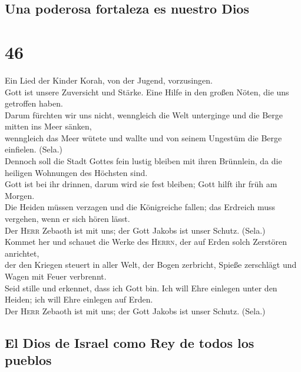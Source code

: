 \hypertarget{una-poderosa-fortaleza-es-nuestro-dios}{%
\subsection{Una poderosa fortaleza es nuestro
Dios}\label{una-poderosa-fortaleza-es-nuestro-dios}}

\hypertarget{section-45}{%
\section{46}\label{section-45}}

 Ein Lied der Kinder Korah, von der Jugend, vorzusingen.\\
 Gott ist unsere Zuversicht und Stärke. Eine Hilfe in den
großen Nöten, die uns getroffen haben.\\
 Darum fürchten wir uns nicht, wenngleich die Welt
unterginge und die Berge mitten ins Meer sänken,\\
 wenngleich das Meer wütete und wallte und von seinem
Ungestüm die Berge einfielen. (Sela.)\\
 Dennoch soll die Stadt Gottes fein lustig bleiben mit
ihren Brünnlein, da die heiligen Wohnungen des Höchsten sind.\\
 Gott ist bei ihr drinnen, darum wird sie fest bleiben;
Gott hilft ihr früh am Morgen.\\
 Die Heiden müssen verzagen und die Königreiche fallen;
das Erdreich muss vergehen, wenn er sich hören lässt.\\
 Der \textsc{Herr} Zebaoth ist mit uns; der Gott Jakobs
ist unser Schutz. (Sela.)\\
 Kommet her und schauet die Werke des \textsc{Herrn}, der
auf Erden solch Zerstören anrichtet,\\
 der den Kriegen steuert in aller Welt, der Bogen
zerbricht, Spieße zerschlägt und Wagen mit Feuer verbrennt.\\
 Seid stille und erkennet, dass ich Gott bin. Ich will
Ehre einlegen unter den Heiden; ich will Ehre einlegen auf Erden.\\
 Der \textsc{Herr} Zebaoth ist mit uns; der Gott Jakobs
ist unser Schutz. (Sela.)

\hypertarget{el-dios-de-israel-como-rey-de-todos-los-pueblos}{%
\subsection{El Dios de Israel como Rey de todos los
pueblos}\label{el-dios-de-israel-como-rey-de-todos-los-pueblos}}

